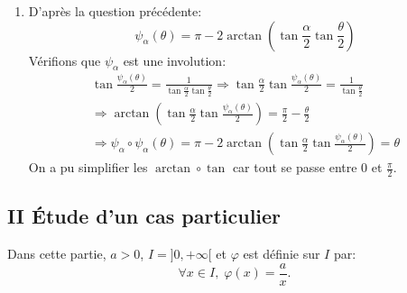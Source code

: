 \begin{enumerate}
\begin{enumerate}
  \item  D'après la question précédente:
\begin{displaymath}
\psi_{\alpha}(\theta) = \pi -2\arctan\left(\tan\frac{\alpha}{2}\tan\frac{\theta}{2} \right)
\end{displaymath}
Vérifions que $\psi_\alpha$ est une involution:
\begin{multline*}
\tan \frac{\psi_\alpha(\theta)}{2} = \frac{1}{\tan\frac{\alpha}{2}\tan\frac{\theta}{2}}
\Rightarrow
\tan \frac{\alpha}{2}\tan \frac{\psi_\alpha(\theta)}{2} = \frac{1}{\tan\frac{\theta}{2}}\\
\Rightarrow \arctan\left(\tan \frac{\alpha}{2}\tan \frac{\psi_\alpha(\theta)}{2} \right)
= \frac{\pi}{2} -\frac{\theta}{2}\\
\Rightarrow
\psi_\alpha \circ \psi_\alpha(\theta)
= \pi -2\arctan\left(\tan \frac{\alpha}{2}\tan \frac{\psi_\alpha(\theta)}{2} \right) = \theta
\end{multline*}
On a pu simplifier les $\arctan \circ \tan$ car tout se passe entre $0$ et $\frac{\pi}{2}$.
\end{enumerate}

\end{enumerate}

\subsection*{II \'Etude d'un cas particulier}
Dans cette partie, $a>0$, $I = ]0, +\infty[$ et $\varphi$ est définie sur $I$ par:
\[ 
\forall x \in I, \; \varphi(x) = \frac{a}{x}.
\]

